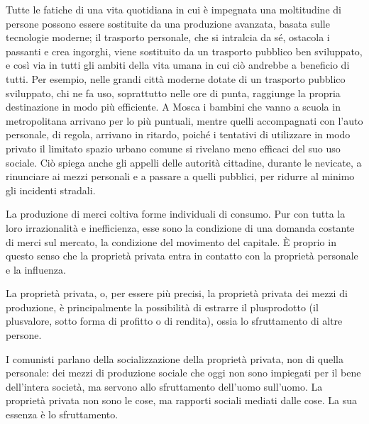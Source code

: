\documentclass[../main]{subfiles}
\begin{document}
Tutte le fatiche di una vita quotidiana in cui è impegnata una moltitudine di persone possono essere sostituite da una produzione avanzata, basata sulle tecnologie moderne; il trasporto personale, che si intralcia da sé, ostacola i passanti e crea ingorghi, viene sostituito da un trasporto pubblico ben sviluppato, e così via in tutti gli ambiti della vita umana in cui ciò andrebbe a beneficio di tutti. Per esempio, nelle grandi città moderne dotate di un trasporto pubblico sviluppato, chi ne fa uso, soprattutto nelle ore di punta, raggiunge la propria destinazione in modo più efficiente. A Mosca i bambini che vanno a scuola in metropolitana arrivano per lo più puntuali, mentre quelli accompagnati con l'auto personale, di regola, arrivano in ritardo, poiché i tentativi di utilizzare in modo privato il limitato spazio urbano comune si rivelano meno efficaci del suo uso sociale. Ciò spiega anche gli appelli delle autorità cittadine, durante le nevicate, a rinunciare ai mezzi personali e a passare a quelli pubblici, per ridurre al minimo gli incidenti stradali.

La produzione di merci coltiva forme individuali di consumo. Pur con tutta la loro irrazionalità e inefficienza, esse sono la condizione di una domanda costante di merci sul mercato, la condizione del movimento del capitale. È proprio in questo senso che la proprietà privata entra in contatto con la proprietà personale e la influenza.

La proprietà privata, o, per essere più precisi, la proprietà privata dei mezzi di produzione, è principalmente la possibilità di estrarre il plusprodotto (il plusvalore, sotto forma di profitto o di rendita), ossia lo sfruttamento di altre persone.

I comunisti parlano della socializzazione della proprietà privata, non di quella personale: dei mezzi di produzione sociale che oggi non sono impiegati per il bene dell'intera società, ma servono allo sfruttamento dell'uomo sull'uomo. La proprietà privata non sono le cose, ma rapporti sociali mediati dalle cose. La sua essenza è lo sfruttamento.
\end{document}
